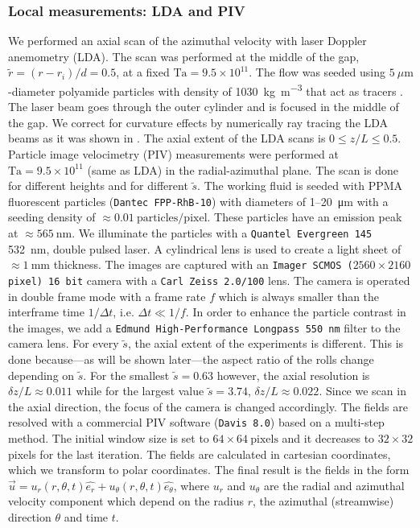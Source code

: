 \subsubsection*{Local measurements: LDA and PIV}
We performed an axial scan of the azimuthal velocity with laser Doppler anemometry (LDA). The scan was performed at the middle of the gap, $\tilde{r}=(r-r_i)/d=0.5$, at a fixed $\text{Ta}=9.5\times 10^{11}$.
The flow was seeded using $\SI{5}{\mu \meter}$-diameter polyamide particles with density of \SI{1030}{\kilo\gram\per\metre\cubed} that act as tracers \citep{vanGils2012}.
The laser beam goes through the outer cylinder and is focused in the middle of the gap. We correct for curvature effects by numerically ray tracing the LDA beams as it was shown in \citet{Huisman2012}. The axial extent of the LDA scans is $0 \leq z/L \leq 0.5$.
Particle image velocimetry (PIV) measurements were performed at $\text{Ta}=9.5\times 10^{11}$ (same as LDA) in the radial-azimuthal plane. The scan is done for different heights and for different $\tilde{s}$.
The working fluid is seeded with PPMA fluorescent particles (\texttt{Dantec FPP-RhB-10}) with diameters of 1--\SI{20}{\micro\metre} with a seeding density of $\approx 0.01 \ \text{particles}/\text{pixel}$.
These particles have an emission peak at $\approx \SI{565}{\nm}$. We illuminate the particles with a \texttt{Quantel Evergreen 145} \SI{532}{\nano\meter}, double pulsed laser. A cylindrical lens is used to create a light sheet of $\approx \SI{1}{\mm}$ thickness. The images are captured with an \texttt{Imager SCMOS ($2560 \times  2160$ pixel) 16 bit} camera with a \texttt{Carl Zeiss 2.0/100} lens. The camera is operated in double frame mode with a frame rate $f$ which is always smaller than the interframe time $1/ \Delta t$, i.e. $\Delta t \ll 1/f$. In order to enhance the particle contrast in the images, we add a \texttt{Edmund High-Performance Longpass 550 nm} filter to the camera lens. For every $\tilde{s}$, the axial extent of the experiments is different. This is done because---as will be shown later---the aspect ratio of the rolls change depending on $\tilde{s}$. For the smallest $\tilde{s}=0.63$ however, the axial resolution is $\delta z/L \approx 0.011$ while for the largest value $\tilde{s}=3.74$, $\delta z / L\approx 0.022$. Since we scan in the axial direction, the focus of the camera is changed accordingly. The fields are resolved with a commercial PIV software (\texttt{Davis 8.0}) based on a multi-step method. The initial window size is set to $64\times 64 \ \text{pixels} $ and it decreases to $32\times 32$ pixels for the last iteration. The fields are calculated in cartesian coordinates, which we transform to polar coordinates. The final result is the fields in the form $\vec{u}=u_r(r,\theta,t)\hat{e_r}+u_\theta(r,\theta,t)\hat{e_\theta}$, where $u_r$ and $u_\theta$ are the radial and azimuthal velocity component which depend on the radius $r$, the azimuthal (streamwise) direction $\theta$ and time $t$.
